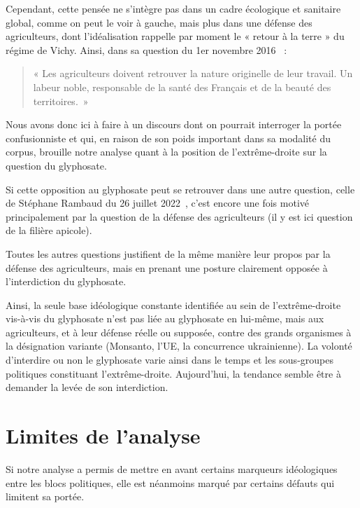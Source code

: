 \documentclass[12pt,twocolumn,landscape]{article}
\begin{document}
    Cependant, cette pensée ne s'intègre pas dans un cadre écologique
    et sanitaire global, comme on peut le voir à gauche,
    mais plus dans une défense des agriculteurs,
    dont l'idéalisation rappelle par moment le « retour à la terre »
    du régime de Vichy.
    Ainsi, dans sa question du 1er novembre 2016~\cite{bombard-question-3} :

    \begin{quotation}
        « Les agriculteurs doivent retrouver la nature originelle de leur travail.
        Un labeur noble, responsable de la santé des Français et de la beauté des territoires.\ »
    \end{quotation}

    Nous avons donc ici à faire à un discours dont on pourrait
    interroger la portée confusionniste
    et qui, en raison de son poids important dans sa modalité
    du corpus, brouille notre analyse quant à la position de l'extrême-droite
    sur la question du glyphosate.

    Si cette opposition au glyphosate peut se retrouver dans une autre
    question, celle de Stéphane Rambaud du 26 juillet 2022~\cite{rambaud-question},
    c'est encore une fois motivé principalement par la question
    de la défense des agriculteurs (il y est ici question de la filière apicole).

    Toutes les autres questions justifient de la même manière
    leur propos par la défense des agriculteurs, mais en prenant
    une posture clairement opposée à l'interdiction du glyphosate.

    Ainsi, la seule base idéologique constante identifiée
    au sein de l'extrême-droite vis-à-vis du glyphosate n'est pas liée
    au glyphosate en lui-même, mais aux agriculteurs,
    et à leur défense réelle ou supposée, contre des grands organismes
    à la désignation variante (Monsanto, l'UE, la concurrence ukrainienne).
    La volonté d'interdire ou non le glyphosate varie ainsi
    dans le temps et les sous-groupes politiques constituant l'extrême-droite.
    Aujourd'hui, la tendance semble être à demander la levée
    de son interdiction.

    \section{Limites de l'analyse}\label{sec:limites-de-l'analyse}

    Si notre analyse a permis de mettre en avant certains
    marqueurs idéologiques entre les blocs politiques,
    elle est néanmoins marqué par certains défauts qui limitent sa portée.
\end{document}
